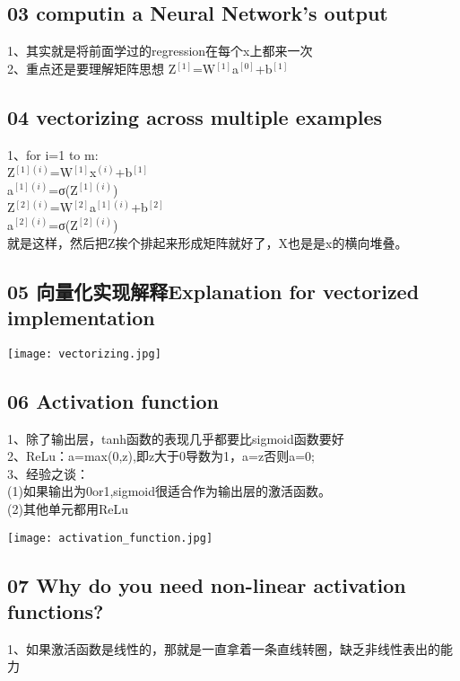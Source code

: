 \documentclass[a4paper,12pt]{article}
\begin{document}
\begin{CJK*}{UTF8}{gbsn}
  \subsection{03 computin a Neural Network's output}
  1、其实就是将前面学过的regression在每个x上都来一次\\
  2、重点还是要理解矩阵思想 Z$^{[1]}$=W$^{[1]}$a$^{[0]}$+b$^{[1]}$\\
  \subsection{04 vectorizing across multiple examples}
\begin{flushleft}
1、for i=1 to m:\\
\qquad Z$^{[1](i)}$=W$^{[1]}$x$^{(i)}$+b$^{[1]}$\\
\qquad a$^{[1](i)}$=σ(Z$^{[1](i)}$)\\
\qquad Z$^{[2](i)}$=W$^{[2]}$a$^{[1](i)}$+b$^{[2]}$\\
\qquad a$^{[2](i)}$=σ(Z$^{[2](i)}$)\\
就是这样，然后把Z挨个排起来形成矩阵就好了，X也是是x的横向堆叠。
\end{flushleft}
\subsection{05 向量化实现解释Explanation for vectorized implementation}



\texttt{[image: vectorizing.jpg]}
\subsection{06 Activation function}
\begin{flushleft}
1、除了输出层，tanh函数的表现几乎都要比sigmoid函数要好\\
2、ReLu：a=max(0,z),即z大于0导数为1，a=z否则a=0;\\
3、经验之谈：\\
\quad (1)如果输出为0or1,sigmoid很适合作为输出层的激活函数。\\
\quad (2)其他单元都用ReLu\\
\end{flushleft}
\texttt{[image: activation\_function.jpg]}\\
\subsection{07 Why do you need non-linear activation functions?}
\begin{flushleft}
1、如果激活函数是线性的，那就是一直拿着一条直线转圈，缺乏非线性表出的能力\\
\end{flushleft}

\end{CJK*}
\end{document}
